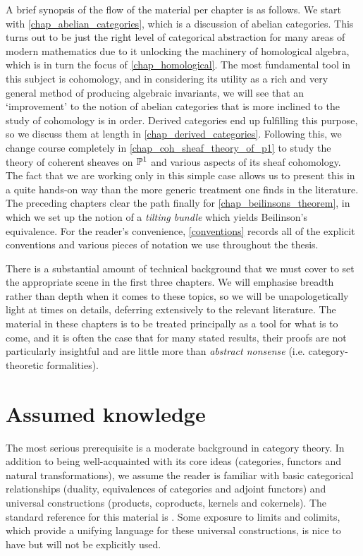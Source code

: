 A brief synopsis of the flow of the material per chapter is as follows.
We start with \cref{chap_abelian_categories}, which is a discussion
of abelian categories.
This turns out to be just the right level of categorical abstraction
for many areas of modern mathematics due to it unlocking the
machinery of homological algebra, which is in turn the focus of
\cref{chap_homological}.
The most fundamental tool in this subject is cohomology, and in
considering its utility as a rich and very general method of
producing algebraic invariants, we will see that an `improvement' to
the notion of abelian categories that is more inclined to the study
of cohomology is in order.
Derived categories end up fulfilling this purpose, so we discuss them
at length in \cref{chap_derived_categories}.
Following this, we change course completely in
\cref{chap_coh_sheaf_theory_of_p1} to study the theory of coherent
sheaves on $\mathbb{P}^{{1}}$ and various aspects of its sheaf cohomology.
The fact that we are working only in this simple case allows us to
present this in a quite hands-on way than the more generic treatment
one finds in the literature.
The preceding chapters clear the path finally for
\cref{chap_beilinsons_theorem}, in which we set up the notion of a
\emph{tilting bundle} which yields Beilinson's equivalence.
For the reader's convenience, \cref{conventions} records all of the
explicit conventions and various pieces of notation we use throughout
the thesis.

There is a substantial amount of technical background that we must
cover to set the appropriate scene in the first three chapters.
We will emphasise breadth rather than depth when it comes to these
topics, so we will be unapologetically light at times on details,
deferring extensively to the relevant literature.
The material in these chapters is to be treated principally as a tool
for what is to come, and it is often the case that for many stated
results, their proofs are not particularly insightful and are little
more than \emph{abstract nonsense} (i.e. category-theoretic formalities).

\section{Assumed knowledge}

The most serious prerequisite is a moderate background in category theory.
In addition to being well-acquainted with its core ideas (categories,
functors and natural transformations), we assume the reader is
familiar with basic categorical relationships (duality, equivalences
of categories and adjoint functors) and universal constructions
(products, coproducts, kernels and cokernels).
The standard reference for this material is
\cite{category_theory_for_the_working_mathematician}.
Some exposure to limits and colimits, which provide a unifying
language for these universal constructions, is nice to have but will
not be explicitly used.

